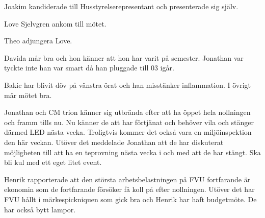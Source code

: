 \documentclass[10pt]{article}
\begin{document}
\begin{paragrafer}
\begin{fyllnadsval}

Joakim kandiderade till Husstyrelserepresentant och presenterade sig själv. 


\end{fyllnadsval}

Love Sjelvgren ankom till mötet.

Theo \ypa adjungera Love.

\Mbaby

\begin{fyllnadsval}


\end{fyllnadsval}




\begin{paragrafer}

Davida mår bra och hon känner att hon har varit på semester. Jonathan var tyckte inte han var smart då han pluggade till 03 igår. 

Bakic har blivit döv på vänstra örat och han misstänker inflammation. 
I övrigt mår mötet bra. 


 
Jonathan och CM trion känner sig utbrända efter att ha öppet hela nollningen och framm tills nu. Nu känner de att har förtjänat och behöver vila och stänger därmed LED nästa vecka. 
Troligtvis kommer det också vara en miljöinspektion den här veckan. Utöver det meddelade Jonathan att de har diskuterat möjligheten till att ha en teprovning nästa vecka i och med att de har stängt. Ska bli kul med ett eget litet event. 

Henrik rapporterade att den största arbetsbelastningen på FVU fortfarande är ekonomin som de fortfarande försöker få koll på efter nollningen.
Utöver det har FVU hållt i märkespickniquen som gick bra och Henrik har haft budgetmöte. De har också bytt lampor. 


\end{paragrafer}
\end{paragrafer}
\end{document}
